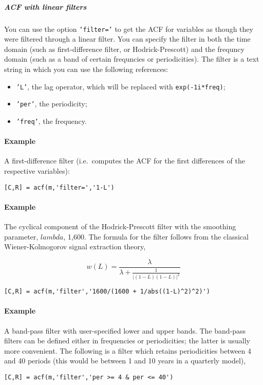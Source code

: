 \subparagraph{ACF with linear filters}

You can use the option \texttt{'filter='} to get the ACF for variables
as though they were filtered through a linear filter. You can specify
the filter in both the time domain (such as first-difference filter, or
Hodrick-Prescott) and the frequncy domain (such as a band of certain
frequncies or periodicities). The filter is a text string in which you
can use the following references:

\begin{itemize}
\itemsep1pt\parskip0pt
\item
  \texttt{'L'}, the lag operator, which will be replaced with
  \texttt{exp(-1i*freq)};
\item
  \texttt{'per'}, the periodicity;
\item
  \texttt{'freq'}, the frequency.
\end{itemize}

\paragraph{Example}

A first-difference filter (i.e.~computes the ACF for the first
differences of the respective variables):

\begin{verbatim}
[C,R] = acf(m,'filter=','1-L')
\end{verbatim}

\paragraph{Example}

The cyclical component of the Hodrick-Prescott filter with the smoothing
parameter, $lambda$, 1,600. The formula for the filter follows from the
classical Wiener-Kolmogorov signal extraction theory,

\[w(L) = \frac{\lambda}{\lambda + \frac{1}{ | (1-L)(1-L) | ^2}}\]

\begin{verbatim}
[C,R] = acf(m,'filter','1600/(1600 + 1/abs((1-L)^2)^2)')
\end{verbatim}

\paragraph{Example}

A band-pass filter with user-specified lower and upper bands. The
band-pass filters can be defined either in frequencies or periodicities;
the latter is usually more convenient. The following is a filter which
retains periodicities between 4 and 40 periods (this would be between 1
and 10 years in a quarterly model),

\begin{verbatim}
[C,R] = acf(m,'filter','per >= 4 & per <= 40')
\end{verbatim}


